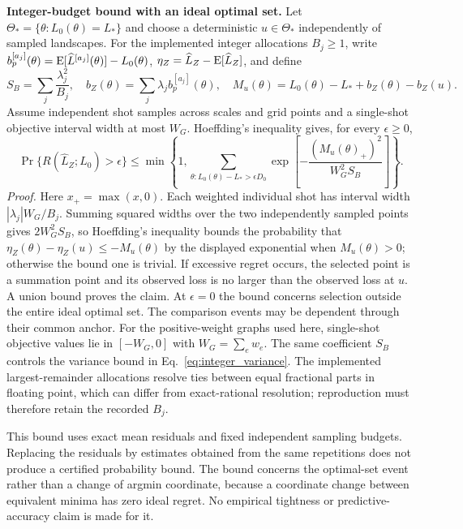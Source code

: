 \noindent\textbf{Integer-budget bound with an ideal optimal set.}
Let $\Theta_*=\{\theta:L_0(\theta)=L_*\}$ and choose a deterministic
$u\in\Theta_*$ independently of sampled landscapes. For the implemented integer
allocations $B_j\geq1$, write $b_p^{[a_j]}(\theta)=\mathrm{E}[\widehat L^{[a_j]}(\theta)]-L_0(\theta)$, $\eta_Z=\widehat L_Z-\mathrm{E}[\widehat L_Z]$, and define
\[
 S_B=\sum_j\frac{\lambda_j^2}{B_j},\quad
 b_Z(\theta)=\sum_j\lambda_j b_p^{[a_j]}(\theta),\quad
 M_u(\theta)=L_0(\theta)-L_*+b_Z(\theta)-b_Z(u).
\]
Assume independent shot samples across scales and grid points and a single-shot
objective interval width at most $W_G$. Hoeffding's inequality \citep{Hoeffding1963} gives, for every $\epsilon\geq0$,
\[
 \Pr\{R(\widehat L_Z;L_0)>\epsilon\}\leq
 \min\left\{1,\sum_{\theta:L_0(\theta)-L_*>\epsilon D_0}
 \exp\left[-\frac{(M_u(\theta)_+)^2}{W_G^2 S_B}\right]\right\}.
\]
\textit{Proof.} Here $x_+=\max(x,0)$. Each weighted individual shot has interval width $|\lambda_j|W_G/B_j$. Summing squared widths over the two independently sampled points gives $2W_G^2S_B$, so Hoeffding's inequality bounds the probability that $\eta_Z(\theta)-\eta_Z(u)\leq-M_u(\theta)$ by the displayed exponential when $M_u(\theta)>0$; otherwise the bound one is trivial.
If excessive regret occurs, the selected point is a summation point and its observed
loss is no larger than the observed loss at $u$. A union bound proves the claim.
At $\epsilon=0$ the bound concerns selection outside the entire ideal optimal set.
The comparison events may be dependent through their common anchor.
For the positive-weight graphs used here, single-shot objective values lie in
$[-W_G,0]$ with $W_G=\sum_e w_e$.
The same coefficient $S_B$ controls the variance bound in Eq.~\eqref{eq:integer_variance}.
The implemented largest-remainder allocations resolve ties between equal fractional
parts in floating point, which can differ from exact-rational resolution;
reproduction must therefore retain the recorded $B_j$.

This bound uses exact mean residuals and fixed independent sampling budgets.
Replacing the residuals by estimates obtained from the same repetitions does not
produce a certified probability bound. The bound concerns the optimal-set event
rather than a change of argmin coordinate, because a coordinate change between
equivalent minima has zero ideal regret. No empirical tightness or
predictive-accuracy claim is made for it.

